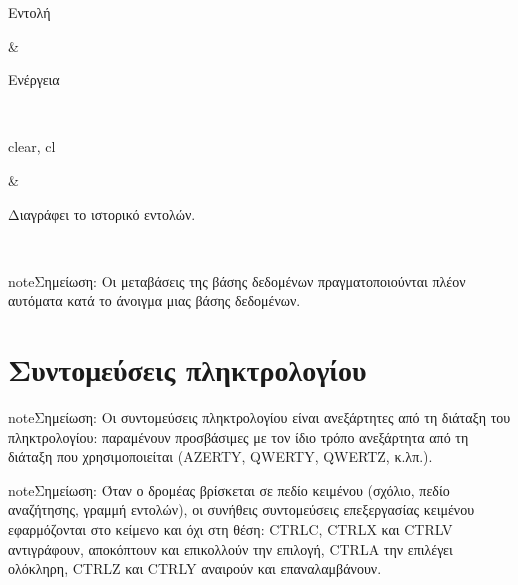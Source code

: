 \documentclass[letterpaper,10pt,greek]{sphinxmanual}
\begin{document}
\begin{savenotes}\sphinxattablestart
\sphinxthistablewithglobalstyle
\centering
\begin{tabular}[t]{}
\sphinxtoprule
\begin{varwidth}[t]{}
\sphinxstyletheadfamily \sphinxAtStartPar
Εντολή
\sphinxbeforeendvarwidth
\end{varwidth}%
&\begin{varwidth}[t]{}
\sphinxstyletheadfamily \sphinxAtStartPar
Ενέργεια
\sphinxbeforeendvarwidth
\end{varwidth}%
\\
\sphinxmidrule
\sphinxtableatstartofbodyhook\begin{varwidth}[t]{}
\sphinxAtStartPar
clear, cl
\sphinxbeforeendvarwidth
\end{varwidth}%
&\begin{varwidth}[t]{}
\sphinxAtStartPar
Διαγράφει το ιστορικό εντολών.
\sphinxbeforeendvarwidth
\end{varwidth}%
\\
\sphinxbottomrule
\end{tabular}
\sphinxtableafterendhook\par
\sphinxattableend\end{savenotes}

\begin{sphinxadmonition}{note}{Σημείωση:}
\sphinxAtStartPar
Οι μεταβάσεις της βάσης δεδομένων πραγματοποιούνται πλέον αυτόματα κατά το άνοιγμα μιας βάσης δεδομένων.
\end{sphinxadmonition}

\sphinxstepscope


\section{Συντομεύσεις πληκτρολογίου}
\label{\detokenize{raccourcis:raccourcis-clavier}}\label{\detokenize{raccourcis:raccourcis}}\label{\detokenize{raccourcis::doc}}
\begin{sphinxadmonition}{note}{Σημείωση:}
\sphinxAtStartPar
Οι συντομεύσεις πληκτρολογίου είναι ανεξάρτητες από τη διάταξη του πληκτρολογίου: παραμένουν προσβάσιμες με τον ίδιο τρόπο ανεξάρτητα από τη διάταξη που χρησιμοποιείται (AZERTY, QWERTY, QWERTZ, κ.λπ.).
\end{sphinxadmonition}

\begin{sphinxadmonition}{note}{Σημείωση:}
\sphinxAtStartPar
Όταν ο δρομέας βρίσκεται σε πεδίο κειμένου (σχόλιο, πεδίο αναζήτησης, γραμμή εντολών), οι συνήθεις συντομεύσεις επεξεργασίας κειμένου εφαρμόζονται στο κείμενο και όχι στη θέση: CTRL\sphinxhyphen{}C, CTRL\sphinxhyphen{}X και CTRL\sphinxhyphen{}V αντιγράφουν, αποκόπτουν και επικολλούν την επιλογή, CTRL\sphinxhyphen{}A την επιλέγει ολόκληρη, CTRL\sphinxhyphen{}Z και CTRL\sphinxhyphen{}Y αναιρούν και επαναλαμβάνουν.
\end{sphinxadmonition}
\end{document}
